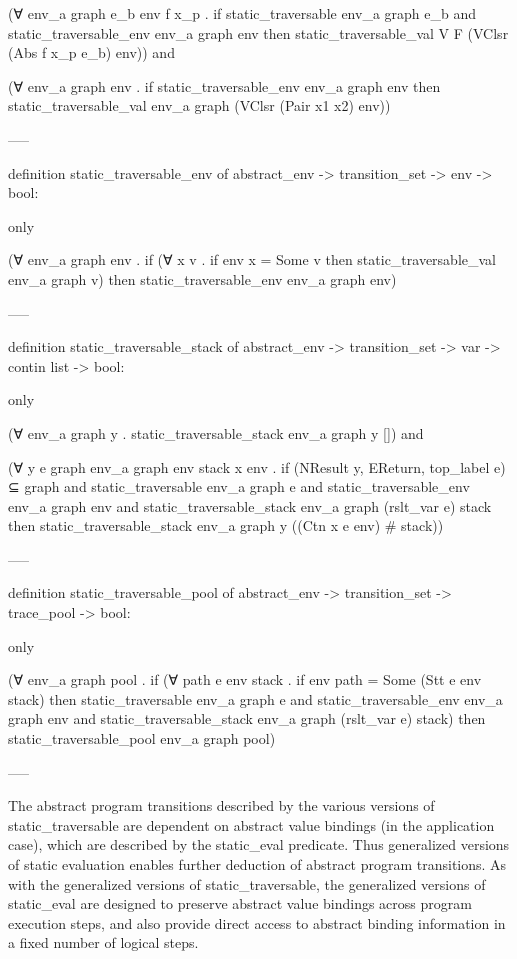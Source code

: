 \documentclass{article}
\begin{document}
(∀ env_a graph e_b env f x_p .
  if
    static_traversable env_a graph e_b and 
    static_traversable_env env_a graph env
  then
    static_traversable_val V F (VClsr (Abs f x_p e_b) env)) and

(∀ env_a graph env . 
  if
    static_traversable_env env_a graph env
  then
    static_traversable_val env_a graph (VClsr (Pair x1 x2) env))

-----

definition static_traversable_env of abstract_env -> transition_set -> env -> bool: 

only 

(∀ env_a graph env .
  if
    (∀ x v . if env x = Some v then static_traversable_val env_a graph v)
  then
    static_traversable_env env_a graph env) 


-----


definition static_traversable_stack of
  abstract_env -> transition_set -> var -> contin list -> bool:

only

(∀ env_a graph y . static_traversable_stack env_a graph y []) and

(∀ y e graph env_a graph env stack x env .
  if 
    {(NResult y, EReturn, top_label e)} ⊆ graph and
    static_traversable env_a graph e and
    static_traversable_env env_a graph env and
    static_traversable_stack env_a graph (rslt_var e) stack 
  then 
    static_traversable_stack env_a graph y ((Ctn x e env) # stack))


-----

definition static_traversable_pool of
  abstract_env -> transition_set -> trace_pool -> bool:

only

(∀ env_a graph pool .
  if
    (∀ path e env stack . if env path = Some (Stt e env stack) then 
      static_traversable env_a graph e and 
      static_traversable_env env_a graph env and 
      static_traversable_stack env_a graph (rslt_var e) stack) 
  then
      static_traversable_pool env_a graph pool)

-----

The abstract program transitions described by the various versions of static_traversable are
dependent on abstract value bindings (in the application case), which are described by the
static_eval predicate.  Thus generalized versions of static evaluation enables further
deduction of abstract program transitions.  As with the generalized versions of
static_traversable, the generalized versions of static_eval are designed to preserve abstract
value bindings across program execution steps, and also provide direct access to abstract
binding information in a fixed number of logical steps. 
\end{document}
